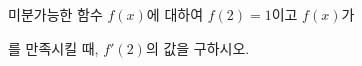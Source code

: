 미분가능한 함수 $f(x)$에 대하여 $f(2)=1$이고 $f(x)$가 \par\smallskip{}\par\smallskip\noindent 를 만족시킬 때, $f'(2)$의 값을 구하시오.
